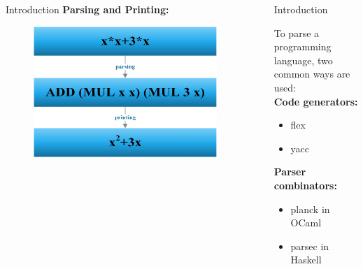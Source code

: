 \documentclass[final]{beamer}
\newlength{\sepwid}
\newlength{\onecolwid}
\newlength{\twocolwid}
\begin{document}
\begin{frame}[t]
\begin{columns}[t]
\begin{column}{\onecolwid}
\begin{block}{Introduction}
\textbf{Parsing and Printing:}

\begin{figure}
\includegraphics[width=0.75\linewidth]{img/parseprintershort.jpg}

\end{figure}


\end{block}


\end{column} %

\begin{column}{\sepwid}\end{column} %

\begin{column}{\twocolwid} %

\begin{columns}[t,totalwidth=\twocolwid] %

\begin{column}{\onecolwid}\vspace{-.6in} %


\begin{block}{Introduction}

To parse a programming language, two common ways are used: \\
\textbf{Code generators:}
\begin{itemize}
\item flex
\item yacc
\end{itemize}
\textbf{Parser combinators:}
\begin{itemize}
\item planck in OCaml
\item parsec in Haskell
\end{itemize}


\end{block}
\end{column}
\end{columns}
\end{column}
\end{columns}
\end{frame}
\end{document}
